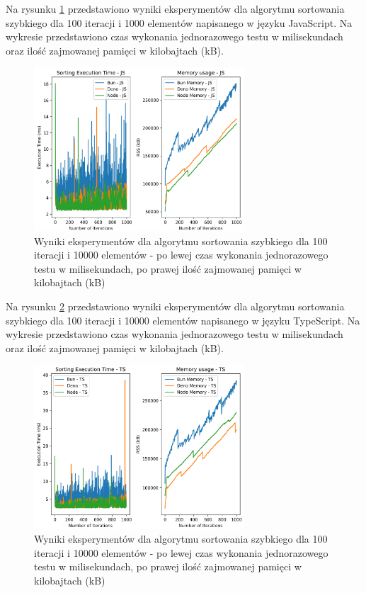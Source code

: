 Na rysunku \ref{fig:quick_sorting_e4} przedstawiono wyniki eksperymentów dla algorytmu sortowania szybkiego dla 100 iteracji i 1000 elementów napisanego w języku JavaScript. Na wykresie przedstawiono czas wykonania jednorazowego testu w milisekundach oraz ilość zajmowanej pamięci w kilobajtach (kB).

\begin{figure}[H]
  \centering
  \includegraphics[width=0.7\textwidth]{Figures/sorting/sorting_quick_1000_10000_js.png}
  \caption{Wyniki eksperymentów dla algorytmu sortowania szybkiego dla 100 iteracji i 10000 elementów - po lewej czas wykonania jednorazowego testu w milisekundach, po prawej ilość zajmowanej pamięci w kilobajtach (kB)}
  \label{fig:quick_sorting_e4}
\end{figure}

Na rysunku \ref{fig:quick_sorting_e4_ts} przedstawiono wyniki eksperymentów dla algorytmu sortowania szybkiego dla 100 iteracji i 10000 elementów napisanego w języku TypeScript. Na wykresie przedstawiono czas wykonania jednorazowego testu w milisekundach oraz ilość zajmowanej pamięci w kilobajtach (kB).

\begin{figure}[H]
  \centering
  \includegraphics[width=0.7\textwidth]{Figures/sorting/sorting_quick_1000_10000_ts.png}
  \caption{Wyniki eksperymentów dla algorytmu sortowania szybkiego dla 100 iteracji i 10000 elementów - po lewej czas wykonania jednorazowego testu w milisekundach, po prawej ilość zajmowanej pamięci w kilobajtach (kB)}
  \label{fig:quick_sorting_e4_ts}
\end{figure}

